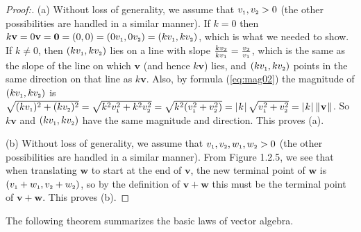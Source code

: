 \begin{proofbar}\begin{proof}[Proof:] (a)
 Without loss of generality, we assume that $v_{\scriptscriptstyle 1}, v_{\scriptscriptstyle 2} > 0$ (the other
 possibilities are handled in a similar manner). If $k = 0$ then $k\mathbf{v} = 0\mathbf{v} = \mathbf{0} = (0,0)
 = (0v_{\scriptscriptstyle 1},0v_{\scriptscriptstyle 2}) = (kv_{\scriptscriptstyle 1},kv_{\scriptscriptstyle 2})$, which
 is what we needed to show. If $k \ne 0$, then $(kv_{\scriptscriptstyle 1},kv_{\scriptscriptstyle 2})$ lies on a line
 with slope $\frac{kv_{\scriptscriptstyle 2}}{kv_{\scriptscriptstyle 1}} =
 \frac{v_{\scriptscriptstyle 2}}{v_{\scriptscriptstyle 1}}$, which is the same as the slope of the line on which
 $\mathbf{v}$ (and hence $k\mathbf{v}$) lies, and $(kv_{\scriptscriptstyle 1},kv_{\scriptscriptstyle 2})$ points in the
 same direction on that line as $k\mathbf{v}$.  Also, by formula (\ref{eq:mag02}) the magnitude of
 $(kv_{\scriptscriptstyle 1},kv_{\scriptscriptstyle 2})$ is $\sqrt{(kv_{\scriptscriptstyle 1})^2 +
 (kv_{\scriptscriptstyle 2})^2} = \sqrt{k^2 v_{\scriptscriptstyle 1}^2 + k^2 v_{\scriptscriptstyle 2}^2} = \sqrt{k^2 (v_{\scriptscriptstyle 1}^2 + v_{\scriptscriptstyle 2}^2)} =
 \lvert\mspace{1mu}k\mspace{1mu}\rvert \,\sqrt{v_{\scriptscriptstyle 1}^2 + v_{\scriptscriptstyle 2}^2} = \lvert\mspace{1mu}k\mspace{1mu}\rvert \,\lVert\mspace{1mu}\mathbf{v}\mspace{1mu}\rVert$.
 So $k\mathbf{v}$ and $(kv_{\scriptscriptstyle 1},kv_{\scriptscriptstyle 2})$ have the same magnitude and direction.
 This proves (a).
 \smallskip
 
 \piccaption[]{}
 \par\noindent(b)
 Without loss of generality, we assume that $v_{\scriptscriptstyle 1}, v_{\scriptscriptstyle 2},
 w_{\scriptscriptstyle 1},w_{\scriptscriptstyle 2} > 0$ (the other possibilities are handled in a similar manner).
 From Figure 1.2.5, we see that when translating $\mathbf{w}$ to start at the end of $\mathbf{v}$, the new
 terminal point of $\mathbf{w}$ is $(v_{\scriptscriptstyle 1} + w_{\scriptscriptstyle 1}, v_{\scriptscriptstyle 2} + w_{\scriptscriptstyle 2})$, so by the definition of $\mathbf{v} + \mathbf{w}$ this must
 be the terminal point of $\mathbf{v} + \mathbf{w}$. 
 This proves (b).
\end{proof}\end{proofbar}
The following theorem summarizes the basic laws of vector algebra.
